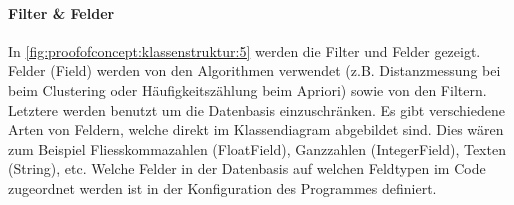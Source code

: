 \paragraph{Filter \& Felder} In \cref{fig:proofofconcept:klassenstruktur:5} werden die Filter und Felder gezeigt. Felder (Field) werden von den Algorithmen verwendet (z.B. Distanzmessung bei beim Clustering oder Häufigkeitszählung beim Apriori) sowie von den Filtern. Letztere werden benutzt um die Datenbasis einzuschränken. Es gibt verschiedene Arten von Feldern, welche direkt im Klassendiagram abgebildet sind. Dies wären zum Beispiel Fliesskommazahlen (FloatField), Ganzzahlen (IntegerField), Texten (String), etc. Welche Felder in der Datenbasis auf welchen Feldtypen im Code zugeordnet werden ist in der Konfiguration des Programmes definiert.

